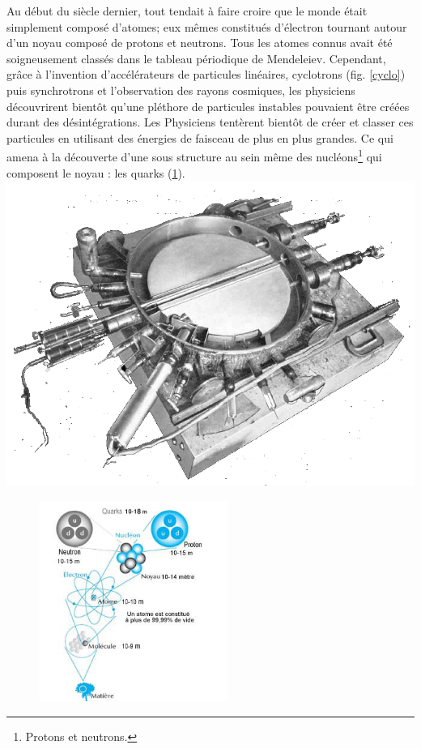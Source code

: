 Au début du siècle dernier, tout tendait à faire croire que le monde était simplement composé d'atomes; eux mêmes constitués d'électron tournant autour d'un noyau composé de protons et neutrons. Tous les atomes connus avait été soigneusement classés dans le tableau périodique de Mendeleiev. Cependant, grâce à l'invention d'accélérateurs de particules linéaires, cyclotrons (fig. \ref{cyclo}) puis synchrotrons et l'observation des rayons cosmiques, les physiciens découvrirent bientôt qu'une pléthore de particules instables pouvaient être créées durant des désintégrations. Les Physiciens tentèrent bientôt de créer et classer ces particules en utilisant des énergies de faisceau de plus en plus grandes. Ce qui amena à la découverte d'une sous structure au sein même des nucléons\footnote{Protons et neutrons.} qui composent le noyau : les quarks (\ref{structure}).
\marginpar
{
	\includegraphics[width=\marginparwidth]{SM/cyclotron.png}
    	\label{cyclo}
}
\begin{figure}[h!]
\centering
\includegraphics[width=0.55\textwidth]{SM/structure.jpg}
\label{structure}
\end{figure}

